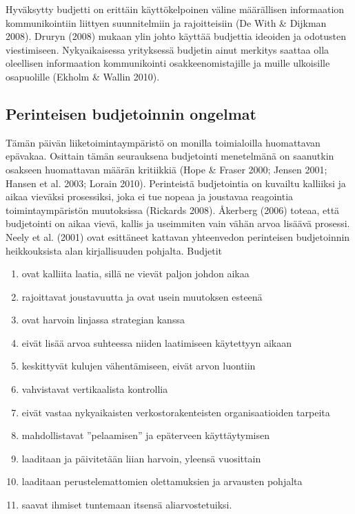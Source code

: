 \documentclass[12pt,a4paper,oneside,pdftex]{report}
\begin{document}
Hyväksytty budjetti on erittäin käyttökelpoinen väline määrällisen informaation kommunikointiin liittyen suunnitelmiin ja rajoitteisiin (De With & Dijkman 2008). Druryn (2008) mukaan ylin johto käyttää budjettia ideoiden ja odotusten viestimiseen. Nykyaikaisessa yrityksessä budjetin ainut merkitys saattaa olla oleellisen informaation kommunikointi osakkeenomistajille ja muille ulkoisille osapuolille (Ekholm & Wallin 2010).

\subsection{Perinteisen budjetoinnin ongelmat}

Tämän päivän liiketoimintaympäristö on monilla toimialoilla huomattavan epävakaa. Osittain tämän seurauksena budjetointi menetelmänä on saanutkin osakseen huomattavan määrän kritiikkiä (Hope & Fraser 2000; Jensen 2001; Hansen et al. 2003; Lorain 2010). Perinteistä budjetointia on kuvailtu kalliiksi ja aikaa vieväksi prosessiksi, joka ei tue nopeaa ja joustavaa reagointia toimintaympäristön muutoksissa (Rickards 2008).  Åkerberg (2006) toteaa, että budjetointi on aikaa vievä, kallis ja useimmiten vain vähän arvoa lisäävä prosessi. Neely et al. (2001) ovat esittäneet kattavan yhteenvedon perinteisen budjetoinnin heikkouksista alan kirjallisuuden pohjalta. Budjetit

\begin{enumerate}
\setlength{\itemsep}{0pt}
\item ovat kalliita laatia, sillä ne vievät paljon johdon aikaa
\item rajoittavat joustavuutta ja ovat usein muutoksen esteenä
\item ovat harvoin linjassa strategian kanssa
\item eivät lisää arvoa suhteessa niiden laatimiseen käytettyyn aikaan
\item keskittyvät kulujen vähentämiseen, eivät arvon luontiin
\item vahvistavat vertikaalista kontrollia
\item eivät vastaa nykyaikaisten verkostorakenteisten organisaatioiden tarpeita
\item mahdollistavat ”pelaamisen” ja epäterveen käyttäytymisen
\item laaditaan ja päivitetään liian harvoin, yleensä vuosittain
\item laaditaan perustelemattomien olettamuksien ja arvausten pohjalta
\item saavat ihmiset tuntemaan itsensä aliarvostetuiksi.
\end{enumerate}
\end{document}
